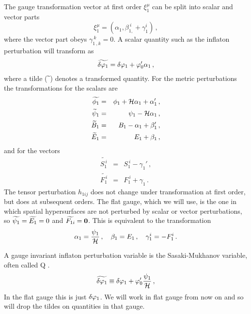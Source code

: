 The gauge transformation vector at first order  $\xi_1^\mu$ can be split into
scalar
and vector parts
% 
\begin{equation}
\label{eq:xidefn-intro}
 \xi_1^\mu = (\alpha_1, \beta_{1,}^{~i} + \gamma_1^i)\,,
\end{equation}
% 
where the vector part obeys $\gamma_{1~,k}^{~k}=0$. A scalar quantity such as
the inflaton perturbation will transform as \cite{Malik:2008im, Malik:2008yp}
% 
\begin{equation}
 \label{eq:dphitransform-intro}
 \widetilde{\delta\varphi_{1}} = \delta\varphi_{1} + \varphi_0' \alpha_1\,,
\end{equation}
where a tilde ($\widetilde{~}$) denotes a transformed quantity. For the metric
perturbations the
transformations for the scalars are
\begin{eqnarray}
 \label{transphi1}
\widetilde {\phi_1} &=& \phi_1 +\H\alpha_1+\alpha_1'\,,\\
%
\label{transpsi1}
\widetilde \psi_1 &=& \psi_1-\H\alpha_1 \,,\\
%
\label{transB1}
\widetilde B_1 &=& B_1-\alpha_1+\beta_1'\,,\\
%
\label{transE1}
\widetilde E_1 &=& E_1+\beta_1\,,
\end{eqnarray}
and for the vectors
\begin{eqnarray}
 \label{transS1}
\widetilde {S_{1}^{~i}} &=& S_{1}^{~i}-\gamma_1'\,, \\
%
\label{transF1}
\widetilde {F_{1}^{~i}} &=& F_{1}^{~i}+\gamma_1\,. 
\end{eqnarray}
% 
The tensor perturbation $h_{1ij}$ does not change under transformation at first
order, but does at subsequent orders.
The flat gauge, which we will use, is the one in which spatial hypersurfaces
are not perturbed by scalar or vector perturbations, so $\widetilde{\psi_1} = \widetilde{E_1}
=0$ and $\widetilde{F_{1i}} = \textbf{0}$.  This is equivalent to the transformation
% 
\begin{equation}
 \alpha_1 = \frac{\psi_1}{\mathcal{H}}\,,\quad \beta_1=E_1 \,, \quad \gamma^i_1 =
-F^i_1\,.
\end{equation}

A gauge invariant inflaton perturbation variable is the Sasaki-Mukhanov
variable, often called Q \cite{Mukhanov:1990me, Mukhanov:1988jd,
Sasaki:1986hm}.
% 
\begin{equation}
\label{eq:flatdvp1-intro}
 \widetilde{\delta\varphi_{1}} \equiv \delta\varphi_{1} + \varphi_0'\frac{\psi_1}{\mathcal{H}}\,,
\end{equation}
% 
In the flat gauge this is just $\delta\varphi_{1}$. We will work in flat
gauge from now on and so will drop the tildes on quantities in that gauge.

